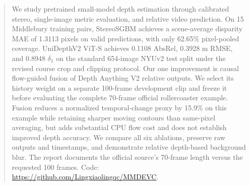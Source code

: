 \begin{abstract}
We study pretrained small-model depth estimation through calibrated stereo, single-image metric evaluation, and relative video prediction. On 15 Middlebury training pairs, StereoSGBM achieves a scene-average disparity MAE of 1.3113 pixels on valid predictions, with only 62.65\% pixel-pooled coverage. UniDepthV2 ViT-S achieves 0.1108 AbsRel, 0.3928 m RMSE, and 0.8948 $\delta_1$ on the standard 654-image NYUv2 test split under the revised course crop and clipping protocol. Our one improvement is causal flow-guided fusion of Depth Anything V2 relative outputs. We select its history weight on a separate 100-frame development clip and freeze it before evaluating the complete 70-frame official rollercoaster example. Fusion reduces a normalized temporal-change proxy by 15.9\% on this example while retaining sharper moving contours than same-pixel averaging, but adds substantial CPU flow cost and does not establish improved depth accuracy. We compare all six ablations, preserve raw outputs and timestamps, and demonstrate relative depth-based background blur. The report documents the official source's 70-frame length versus the requested 100 frames. Code: \url{https://github.com/Lingxiaolingqc/MMDEVC}.
\end{abstract}
